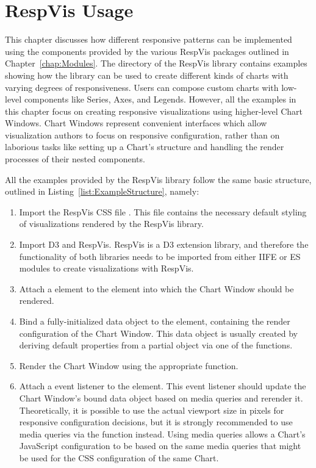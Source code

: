 \chapter{RespVis Usage}
\label{chap:Usage}

This chapter discusses how different responsive patterns can be
implemented using the components provided by the various RespVis
packages outlined in Chapter~\ref{chap:Modules}. The
 directory of the RespVis library contains examples
showing how the library can be used to create different kinds of
charts with varying degrees of responsiveness. Users can compose
custom charts with low-level components like Series, Axes, and
Legends. However, all the examples in this chapter focus on creating
responsive visualizations using higher-level Chart Windows. Chart
Windows represent convenient interfaces which allow visualization
authors to focus on responsive configuration, rather than on laborious
tasks like setting up a Chart's structure and handling the render
processes of their nested components.

All the examples provided by the RespVis library follow the same basic
structure, outlined in Listing~\ref{list:ExampleStructure}, namely:
\begin{enumerate}
\item Import the RespVis CSS file .  This file
  contains the necessary default styling of visualizations rendered by
  the RespVis library.

\item Import D3 and RespVis. RespVis is a D3 extension library, and
  therefore the functionality of both libraries needs to be imported
  from either IIFE or ES modules to create visualizations with
  RespVis.


\item Attach a  element to the element into which the
  Chart Window should be rendered.

\item Bind a fully-initialized data object to the  element,
  containing the render configuration of the Chart Window. This data
  object is usually created by deriving default properties from a
  partial object via one of the  functions.

\item Render the Chart Window using the appropriate
   function.

\item Attach a  event listener to the 
  element. This event listener should update the Chart Window's bound
  data object based on media queries and rerender it. Theoretically,
  it is possible to use the actual viewport size in pixels for
  responsive configuration decisions, but it is strongly recommended
  to use media queries via the  function
  instead. Using media queries allows a Chart's JavaScript
  configuration to be based on the same media queries that might be
  used for the CSS configuration of the same Chart.
\end{enumerate}



